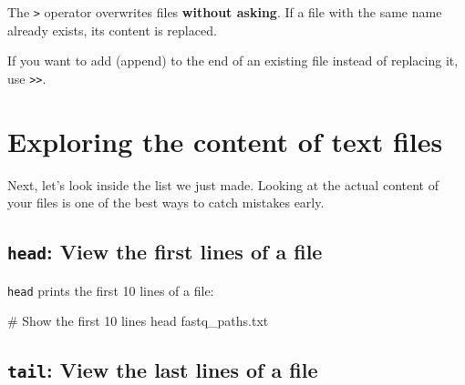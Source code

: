 \documentclass[
  letterpaper,
  DIV=11,
  numbers=noendperiod]{scrreprt}
\newenvironment{Shaded}{}{}
\newcommand{\CommentTok}[1]{\textcolor[rgb]{0.42,0.45,0.49}{#1}}
\newcommand{\FunctionTok}[1]{\textcolor[rgb]{0.44,0.26,0.76}{#1}}
\newcommand{\NormalTok}[1]{\textcolor[rgb]{0.14,0.16,0.18}{#1}}
\begin{document}
\begin{tcolorbox}[enhanced jigsaw, coltitle=black, breakable, titlerule=0mm, colback=white, rightrule=.15mm, bottomrule=.15mm, toprule=.15mm, colframe=quarto-callout-important-color-frame, colbacktitle=quarto-callout-important-color!10!white, bottomtitle=1mm, opacitybacktitle=0.6, toptitle=1mm, leftrule=.75mm, arc=.35mm, title=\textcolor{quarto-callout-important-color}{\faExclamation}\hspace{0.5em}{Important: Be careful with \textgreater{}}, left=2mm, opacityback=0]

The \texttt{\textgreater{}} operator overwrites files \textbf{without
asking}. If a file with the same name already exists, its content is
replaced.

If you want to add (append) to the end of an existing file instead of
replacing it, use \texttt{\textgreater{}\textgreater{}}.

\end{tcolorbox}

\section{Exploring the content of text
files}\label{exploring-the-content-of-text-files}

Next, let's look inside the list we just made. Looking at the actual
content of your files is one of the best ways to catch mistakes early.

\subsection{\texorpdfstring{\texttt{head}: View the first lines of a
file}{head: View the first lines of a file}}\label{head-view-the-first-lines-of-a-file}

\texttt{head} prints the first 10 lines of a file:

\begin{Shaded}
\begin{Highlighting}[]
\CommentTok{\# Show the first 10 lines}
\FunctionTok{head}\NormalTok{ fastq\_paths.txt}
\end{Highlighting}
\end{Shaded}

\subsection{\texorpdfstring{\texttt{tail}: View the last lines of a
file}{tail: View the last lines of a file}}\label{tail-view-the-last-lines-of-a-file}
\end{document}
